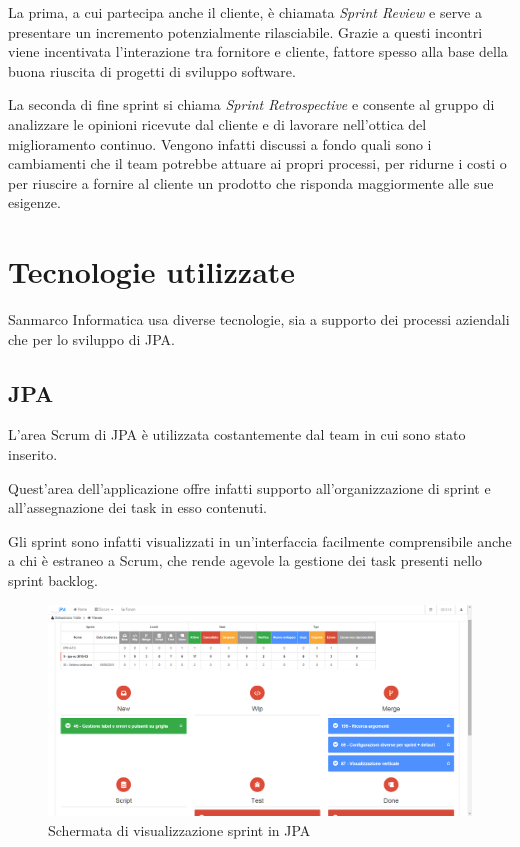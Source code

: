La prima, a cui partecipa anche il cliente, è chiamata \emph{Sprint Review} e
serve a presentare un incremento potenzialmente rilasciabile. Grazie
a questi incontri viene incentivata l'interazione tra fornitore e cliente,
fattore spesso alla base della buona riuscita di progetti di sviluppo software.

La seconda  di fine sprint si chiama \emph{Sprint
Retrospective} e consente al gruppo di analizzare le opinioni ricevute dal
cliente e di lavorare nell'ottica del miglioramento continuo. Vengono infatti
discussi a fondo quali sono i cambiamenti che il team potrebbe attuare ai
propri processi, per ridurne i costi o per riuscire a fornire al cliente un
prodotto che risponda maggiormente alle sue esigenze.
\section{Tecnologie utilizzate}

Sanmarco Informatica usa diverse tecnologie, sia a supporto dei processi
aziendali che per lo sviluppo di JPA.

\subsection{JPA}

L'area Scrum di JPA è utilizzata costantemente dal team in cui sono stato
inserito.

Quest'area dell'applicazione offre infatti supporto all'organizzazione di
sprint e all'assegnazione dei task in esso contenuti.

Gli sprint sono infatti visualizzati in un'interfaccia facilmente comprensibile
anche a chi è estraneo a Scrum, che rende agevole la gestione dei task presenti
nello sprint backlog.

\begin{figure}%
\includegraphics[width=\columnwidth]{immagini/jpa-sprint-viewer}%
\caption{Schermata di visualizzazione sprint in JPA}%
\label{fig:jpa-viewer}%
\end{figure}

